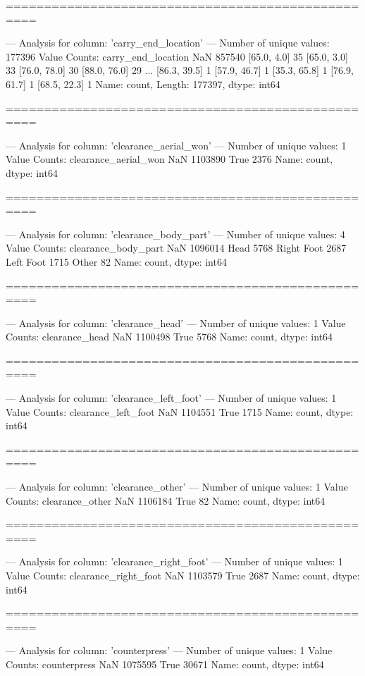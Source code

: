 ==================================================

--- Analysis for column: 'carry_end_location' ---
Number of unique values: 177396
Value Counts:
carry_end_location
NaN             857540
[65.0, 4.0]         35
[65.0, 3.0]         33
[76.0, 78.0]        30
[88.0, 76.0]        29
                 ...  
[86.3, 39.5]         1
[57.9, 46.7]         1
[35.3, 65.8]         1
[76.9, 61.7]         1
[68.5, 22.3]         1
Name: count, Length: 177397, dtype: int64

==================================================

--- Analysis for column: 'clearance_aerial_won' ---
Number of unique values: 1
Value Counts:
clearance_aerial_won
NaN     1103890
True       2376
Name: count, dtype: int64

==================================================

--- Analysis for column: 'clearance_body_part' ---
Number of unique values: 4
Value Counts:
clearance_body_part
NaN           1096014
Head             5768
Right Foot       2687
Left Foot        1715
Other              82
Name: count, dtype: int64

==================================================

--- Analysis for column: 'clearance_head' ---
Number of unique values: 1
Value Counts:
clearance_head
NaN     1100498
True       5768
Name: count, dtype: int64

==================================================

--- Analysis for column: 'clearance_left_foot' ---
Number of unique values: 1
Value Counts:
clearance_left_foot
NaN     1104551
True       1715
Name: count, dtype: int64

==================================================

--- Analysis for column: 'clearance_other' ---
Number of unique values: 1
Value Counts:
clearance_other
NaN     1106184
True         82
Name: count, dtype: int64

==================================================

--- Analysis for column: 'clearance_right_foot' ---
Number of unique values: 1
Value Counts:
clearance_right_foot
NaN     1103579
True       2687
Name: count, dtype: int64

==================================================

--- Analysis for column: 'counterpress' ---
Number of unique values: 1
Value Counts:
counterpress
NaN     1075595
True      30671
Name: count, dtype: int64

